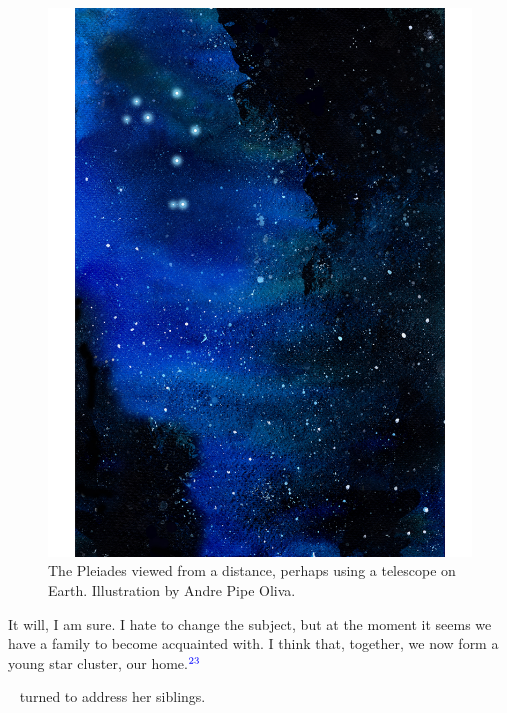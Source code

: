 \documentclass[main.tex]{subfiles}
\begin{document}
\begin{figure}
\includegraphics[width=\columnwidth,angle=270,origin=c]{ch1_4.pdf}
\caption{The Pleiades viewed from a distance, perhaps using a telescope on Earth.  Illustration by Andre Pipe Oliva.
\label{fig:fig4}}
\end{figure}


\par \Maia It will, I am sure.  I hate to change the subject, but at the moment it seems we have a family to become acquainted with.  I think that, together, we now form a young star cluster, our home.$^{\textcolor{blue}{23}}$

\par \nar \rmmaia~ turned to address her siblings.

\end{document}
